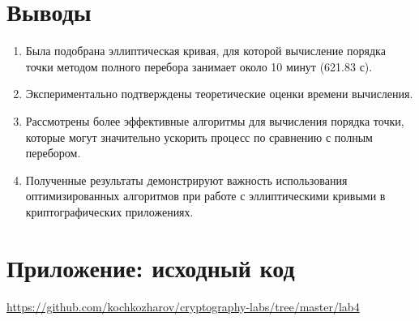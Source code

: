 \documentclass[a4paper,12pt]{article}
\begin{document}
\section{Выводы}
\begin{enumerate}
    \item Была подобрана эллиптическая кривая, для которой вычисление порядка точки методом полного перебора занимает около 10 минут (621.83 с).
    \item Экспериментально подтверждены теоретические оценки времени вычисления.
    \item Рассмотрены более эффективные алгоритмы для вычисления порядка точки, которые могут значительно ускорить процесс по сравнению с полным перебором.
    \item Полученные результаты демонстрируют важность использования оптимизированных алгоритмов при работе с эллиптическими кривыми в криптографических приложениях.
\end{enumerate}

\section{Приложение: исходный код}
\href{https://github.com/kochkozharov/cryptography-labs/tree/master/lab4}{https://github.com/kochkozharov/cryptography-labs/tree/master/lab4} 
\end{document}
